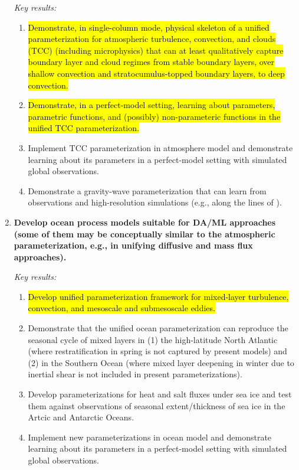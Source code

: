 \documentclass{article}
\newcommand{\hlg}[1]{{\sethlcolor{green}\hl{#1}}}
\begin{document}
\begin{enumerate}
    \emph{Key results:}
    \begin{enumerate}
        \item \hlg{Demonstrate, in single-column mode, physical skeleton of a unified parameterization for atmospheric turbulence, convection, and clouds (TCC) (including microphysics) that can at least qualitatively capture boundary layer and cloud regimes from stable boundary layers, over shallow convection and stratocumulus-topped boundary layers, to deep convection.}
        \item \hlg{Demonstrate, in a perfect-model setting, learning about parameters, parametric functions, and (possibly) non-parameteric functions in the unified TCC parameterization.}
        \item Implement TCC parameterization in atmosphere model and demonstrate learning about its parameters in a perfect-model setting with simulated global observations.
        \item Demonstrate a gravity-wave parameterization that can learn from observations and high-resolution simulations (e.g., along the lines of \citet{Garner18a, Zhao18a}).
    \end{enumerate}
    
     \item \textbf{Develop ocean process models suitable for DA/ML approaches (some of them may be conceptually similar to the atmospheric parameterization, e.g., in unifying diffusive and mass flux approaches).}
    
    \emph{Key results:}
    \begin{enumerate}
        \item \hlg{Develop unified parameterization framework for mixed-layer turbulence, convection, and mesoscale and submesoscale eddies.}
        \item Demonstrate that the unified ocean parameterization can reproduce the seasonal cycle of mixed layers in (1) the high-latitude North Atlantic (where restratification in spring is not captured by present models) and (2) in the Southern Ocean (where mixed layer deepening in winter due to inertial shear is not included in present parameterizations).
        \item Develop parameterizations for heat and salt fluxes under sea ice and test them against observations of seasonal extent/thickness of sea ice in the Artcic and Antarctic Oceans.
        \item Implement new parameterizations in ocean model and demonstrate learning about its parameters in a perfect-model setting with simulated global observations.
    \end{enumerate}
    

\end{enumerate}
\end{document}
